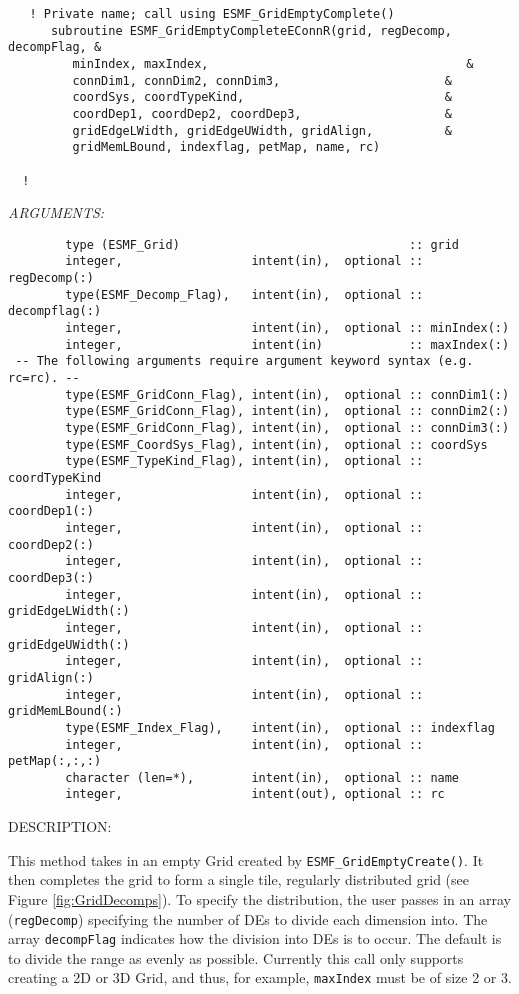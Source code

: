  
\begin{verbatim}   ! Private name; call using ESMF_GridEmptyComplete()
      subroutine ESMF_GridEmptyCompleteEConnR(grid, regDecomp, decompFlag, &
         minIndex, maxIndex,                                    &
         connDim1, connDim2, connDim3,                       &
         coordSys, coordTypeKind,                            &
         coordDep1, coordDep2, coordDep3,                    &
         gridEdgeLWidth, gridEdgeUWidth, gridAlign,          &
         gridMemLBound, indexflag, petMap, name, rc)
 
  !\end{verbatim}{\em ARGUMENTS:}
\begin{verbatim}        type (ESMF_Grid)                                :: grid
        integer,                  intent(in),  optional :: regDecomp(:)
        type(ESMF_Decomp_Flag),   intent(in),  optional :: decompflag(:)
        integer,                  intent(in),  optional :: minIndex(:)
        integer,                  intent(in)            :: maxIndex(:)
 -- The following arguments require argument keyword syntax (e.g. rc=rc). --
        type(ESMF_GridConn_Flag), intent(in),  optional :: connDim1(:)
        type(ESMF_GridConn_Flag), intent(in),  optional :: connDim2(:)
        type(ESMF_GridConn_Flag), intent(in),  optional :: connDim3(:)
        type(ESMF_CoordSys_Flag), intent(in),  optional :: coordSys
        type(ESMF_TypeKind_Flag), intent(in),  optional :: coordTypeKind
        integer,                  intent(in),  optional :: coordDep1(:)
        integer,                  intent(in),  optional :: coordDep2(:)
        integer,                  intent(in),  optional :: coordDep3(:)
        integer,                  intent(in),  optional :: gridEdgeLWidth(:)
        integer,                  intent(in),  optional :: gridEdgeUWidth(:)
        integer,                  intent(in),  optional :: gridAlign(:)
        integer,                  intent(in),  optional :: gridMemLBound(:)
        type(ESMF_Index_Flag),    intent(in),  optional :: indexflag
        integer,                  intent(in),  optional :: petMap(:,:,:)
        character (len=*),        intent(in),  optional :: name
        integer,                  intent(out), optional :: rc\end{verbatim}
{\sf DESCRIPTION:\\ }


  
   This method takes in an empty Grid created by {\tt ESMF\_GridEmptyCreate()}.
   It then completes the grid to form a single tile, regularly distributed grid
   (see Figure \ref{fig:GridDecomps}).
   To specify the distribution, the user passes in an array
   ({\tt regDecomp}) specifying the number of DEs to divide each
   dimension into. The array {\tt decompFlag} indicates how the division into DEs is to
   occur.  The default is to divide the range as evenly as possible. Currently this call
   only supports creating a 2D or 3D Grid, and thus, for example, {\tt maxIndex} must be of size 2 or 3.
  
